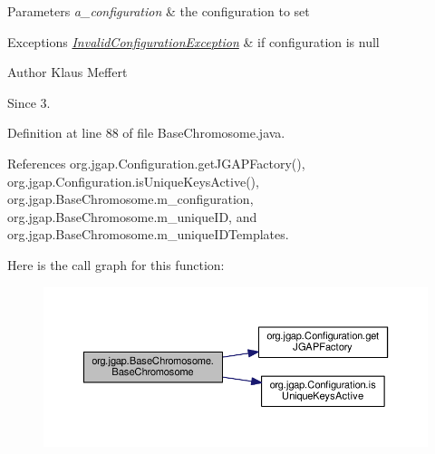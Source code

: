 \begin{DoxyParams}{Parameters}
{\em a\-\_\-configuration} & the configuration to set \\
\hline
\end{DoxyParams}

\begin{DoxyExceptions}{Exceptions}
{\em \hyperlink{classorg_1_1jgap_1_1_invalid_configuration_exception}{Invalid\-Configuration\-Exception}} & if configuration is null\\
\hline
\end{DoxyExceptions}
\begin{DoxyAuthor}{Author}
Klaus Meffert 
\end{DoxyAuthor}
\begin{DoxySince}{Since}
3. 
\end{DoxySince}


Definition at line 88 of file Base\-Chromosome.\-java.



References org.\-jgap.\-Configuration.\-get\-J\-G\-A\-P\-Factory(), org.\-jgap.\-Configuration.\-is\-Unique\-Keys\-Active(), org.\-jgap.\-Base\-Chromosome.\-m\-\_\-configuration, org.\-jgap.\-Base\-Chromosome.\-m\-\_\-unique\-I\-D, and org.\-jgap.\-Base\-Chromosome.\-m\-\_\-unique\-I\-D\-Templates.



Here is the call graph for this function\-:
\nopagebreak
\begin{figure}[H]
\begin{center}
\leavevmode
\includegraphics[width=350pt]{classorg_1_1jgap_1_1_base_chromosome_a94e1af5ba804061833ed3883d42f9441_cgraph}
\end{center}
\end{figure}




